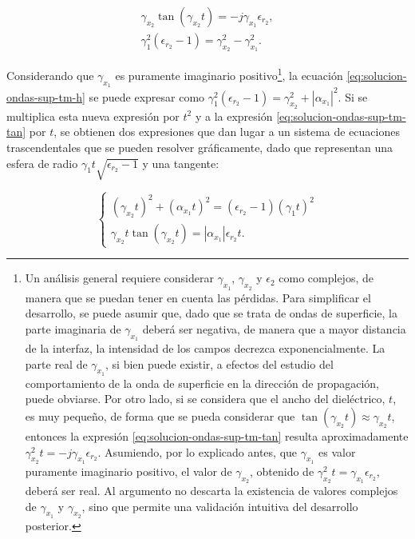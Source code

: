 \begin{align}
	\label{eq:solucion-ondas-sup-tm-tan}
	\gamma_{x_2} \tan (\gamma_{x_2} t) = -j \gamma_{x_1} \epsilon_{r_2}, \\
	\gamma_1^2 (\epsilon_{r_2}-1) = \gamma_{x_2}^2 - \gamma_{x_1}^2.
	\label{eq:solucion-ondas-sup-tm-h}
\end{align}

Considerando que $\gamma_{x_1}$ es puramente imaginario positivo\footnote{Un análisis general requiere considerar $\gamma_{x_1}$, $\gamma_{x_2}$ y $\epsilon_2$ como complejos, de manera que se puedan tener en cuenta las pérdidas. Para simplificar el desarrollo, se puede asumir que, dado que se trata de ondas de superficie, la parte imaginaria de $\gamma_{x_1}$ deberá ser negativa, de manera que a mayor distancia de la interfaz, la intensidad de los campos decrezca exponencialmente. La parte real de $\gamma_{x_1}$, si bien puede existir, a efectos del estudio del comportamiento de la onda de superficie en la dirección de propagación, puede obviarse. Por otro lado, si se considera que el ancho del dieléctrico, $t$, es muy pequeño, de forma que se pueda considerar que $\tan(\gamma_{x_2} t) \approx \gamma_{x_2} t$, entonces la expresión \ref{eq:solucion-ondas-sup-tm-tan} resulta aproximadamente $\gamma_{x_2}^2 t = -j \gamma_{x_1} \epsilon_{r_2}$. Asumiendo, por lo explicado antes, que $\gamma_{x_1}$ es valor puramente imaginario positivo, el valor de $\gamma_{x_2}$, obtenido de $\gamma_{x_2}^2 t = \gamma_{x_1} \epsilon_{r_2}$, deberá ser real. Al argumento no descarta la existencia de valores complejos de $\gamma_{x_1}$ y $\gamma_{x_2}$, sino que permite una validación intuitiva del desarrollo posterior.}, la ecuación \ref{eq:solucion-ondas-sup-tm-h} se puede expresar como $\gamma_1^2 (\epsilon_{r_2}-1) = \gamma_{x_2}^2 + |\alpha_{x_1}|^2$. Si se multiplica esta nueva expresión por $t^2$ y a la expresión \ref{eq:solucion-ondas-sup-tm-tan} por $t$, se obtienen dos expresiones que dan lugar a un sistema de ecuaciones trascendentales que se pueden resolver gráficamente, dado que representan una esfera de radio $\gamma_1 t \sqrt{\epsilon_{r_2}-1}$ y una tangente:

\begin{equation}
	\label{eq:sistema-ondas-superficiales-TM}
	\begin{cases}
		(\gamma_{x_2} t)^2 + (\alpha_{x_1} t)^2 = (\epsilon_{r_2} - 1) (\gamma_1 t)^2\\
		\gamma_{x_2} t \tan (\gamma_{x_2} t) = |\alpha_{x_1}| \epsilon_{r_2} t.
	\end{cases}
\end{equation}

